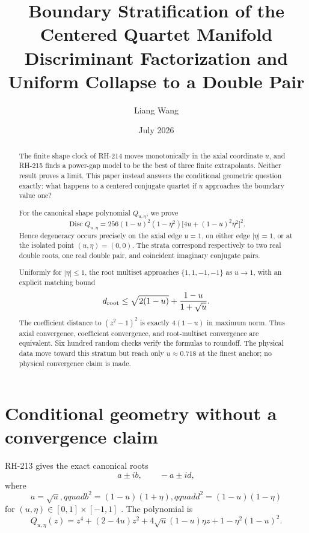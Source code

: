\documentclass[12pt]{article}
\title{Boundary Stratification of the Centered Quartet Manifold\\
\large Discriminant Factorization and Uniform Collapse to a Double Pair}
\author{Liang Wang}\date{July 2026}
\theoremstyle{remark}\newtheorem{remark}[theorem]{Remark}
\begin{document}
\maketitle
\begin{abstract}
The finite shape clock of RH-214 moves monotonically in the axial coordinate
$u$, and RH-215 finds a power-gap model to be the best of three finite
extrapolants.  Neither result proves a limit.  This paper instead answers the
conditional geometric question exactly: what happens to a centered
conjugate quartet if $u$ approaches the boundary value one?

For the canonical shape polynomial $Q_{u,\eta}$, we prove
\[
 \operatorname{Disc}Q_{u,\eta}
 =256(1-u)^2(1-\eta^2)
   \bigl[4u+(1-u)^2\eta^2\bigr]^2.
\]
Hence degeneracy occurs precisely on the axial edge $u=1$, on either edge
$|\eta|=1$, or at the isolated point $(u,\eta)=(0,0)$.  The strata correspond
respectively to two real double roots, one real double pair, and coincident
imaginary conjugate pairs.

Uniformly for $|\eta|\le1$, the root multiset approaches
$\{1,1,-1,-1\}$ as $u\to1$, with an explicit matching bound
\[
 d_{\rm root}\le \sqrt{2(1-u)}+
 \frac{1-u}{1+\sqrt u}.
\]
The coefficient distance to $(z^2-1)^2$ is exactly $4(1-u)$ in maximum norm.
Thus axial convergence, coefficient convergence, and root-multiset
convergence are equivalent.  Six hundred random checks verify the formulas
to roundoff.  The physical data move toward this stratum but reach only
$u\approx0.718$ at the finest anchor; no physical convergence claim is made.
\end{abstract}

\section{Conditional geometry without a convergence claim}

RH-213 gives the exact canonical roots
\begin{equation}\label{eq:roots}
 a\pm ib,\qquad -a\pm id,
\end{equation}
where
\begin{equation}\label{eq:abd}
 a=\sqrt u,qquad
 b^2=(1-u)(1+\eta),qquad
 d^2=(1-u)(1-\eta)
\end{equation}
for $(u,\eta)\in[0,1]\times[-1,1]$
\citep{WangRH213}.  The polynomial is
\begin{equation}\label{eq:poly}
 Q_{u,\eta}(z)=z^4+(2-4u)z^2
 +4\sqrt u(1-u)\eta z+1-\eta^2(1-u)^2.
\end{equation}
\end{document}
